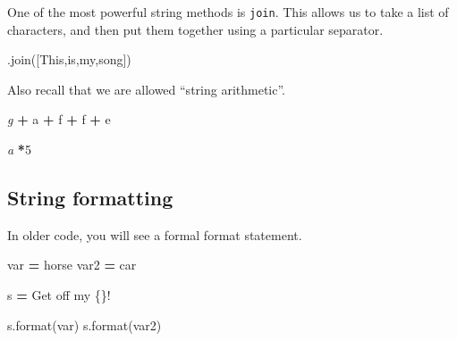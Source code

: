 \documentclass[
  letterpaper,
]{scrbook}
\newenvironment{Shaded}{\begin{snugshade}}{\end{snugshade}}
\newcommand{\BuiltInTok}[1]{#1}
\newcommand{\CommentTok}[1]{\textcolor[rgb]{0.56,0.35,0.01}{\textit{#1}}}
\newcommand{\DecValTok}[1]{\textcolor[rgb]{0.00,0.00,0.81}{#1}}
\newcommand{\NormalTok}[1]{#1}
\newcommand{\OperatorTok}[1]{\textcolor[rgb]{0.81,0.36,0.00}{\textbf{#1}}}
\newcommand{\SpecialCharTok}[1]{\textcolor[rgb]{0.00,0.00,0.00}{#1}}
\newcommand{\StringTok}[1]{\textcolor[rgb]{0.31,0.60,0.02}{#1}}
\begin{document}
One of the most powerful string methods is \texttt{join}. This allows us to take a list of characters, and then
put them together using a particular separator.

\begin{Shaded}
\begin{Highlighting}[]
\CommentTok{\textquotesingle{} \textquotesingle{}}\NormalTok{.join([}\StringTok{\textquotesingle{}This\textquotesingle{}}\NormalTok{,}\StringTok{\textquotesingle{}is\textquotesingle{}}\NormalTok{,}\StringTok{\textquotesingle{}my\textquotesingle{}}\NormalTok{,}\StringTok{\textquotesingle{}song\textquotesingle{}}\NormalTok{])}
\end{Highlighting}
\end{Shaded}

Also recall that we are allowed ``string arithmetic''.

\begin{Shaded}
\begin{Highlighting}[]
\CommentTok{\textquotesingle{}g\textquotesingle{}} \OperatorTok{+} \StringTok{\textquotesingle{}a\textquotesingle{}} \OperatorTok{+} \StringTok{\textquotesingle{}f\textquotesingle{}} \OperatorTok{+} \StringTok{\textquotesingle{}f\textquotesingle{}} \OperatorTok{+} \StringTok{\textquotesingle{}e\textquotesingle{}}

\CommentTok{\textquotesingle{}a \textquotesingle{}}\OperatorTok{*}\DecValTok{5}
\end{Highlighting}
\end{Shaded}

\hypertarget{string-formatting}{%
\subsection{String formatting}\label{string-formatting}}

In older code, you will see a formal format statement.

\begin{Shaded}
\begin{Highlighting}[]
\NormalTok{var }\OperatorTok{=} \StringTok{\textquotesingle{}horse\textquotesingle{}}
\NormalTok{var2 }\OperatorTok{=} \StringTok{\textquotesingle{}car\textquotesingle{}}

\NormalTok{s }\OperatorTok{=} \StringTok{\textquotesingle{}Get off my }\SpecialCharTok{\{\}}\StringTok{!\textquotesingle{}}

\NormalTok{s.}\BuiltInTok{format}\NormalTok{(var)}
\NormalTok{s.}\BuiltInTok{format}\NormalTok{(var2)}
\end{Highlighting}
\end{Shaded}
\end{document}
